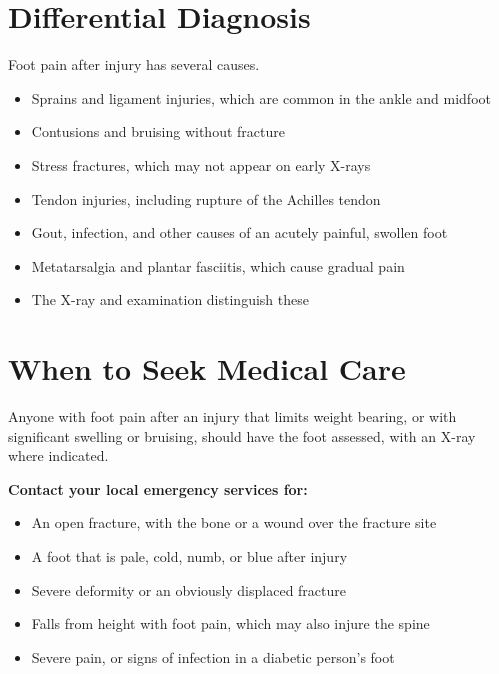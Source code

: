 \section*{Differential Diagnosis}
Foot pain after injury has several causes.
\begin{itemize}
    \item Sprains and ligament injuries, which are common in the ankle and midfoot
    \item Contusions and bruising without fracture
    \item Stress fractures, which may not appear on early X-rays
    \item Tendon injuries, including rupture of the Achilles tendon
    \item Gout, infection, and other causes of an acutely painful, swollen foot
    \item Metatarsalgia and plantar fasciitis, which cause gradual pain
    \item The X-ray and examination distinguish these
\end{itemize}

\section*{When to Seek Medical Care}
Anyone with foot pain after an injury that limits weight bearing, or with significant swelling or bruising, should have the foot assessed, with an X-ray where indicated.

\textbf{Contact your local emergency services for:}
\begin{itemize}
    \item An open fracture, with the bone or a wound over the fracture site
    \item A foot that is pale, cold, numb, or blue after injury
    \item Severe deformity or an obviously displaced fracture
    \item Falls from height with foot pain, which may also injure the spine
    \item Severe pain, or signs of infection in a diabetic person's foot
\end{itemize}

